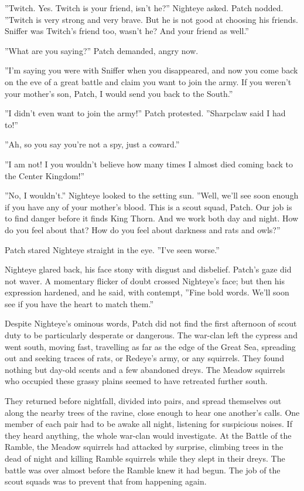 \documentclass[11pt]{article}
\begin{document}
 ''Twitch. Yes. Twitch is your friend, isn't he?'' Nighteye asked. Patch nodded. ''Twitch is very strong and very brave. But he is not good at choosing his friends. Sniffer was Twitch's friend too, wasn't he? And your friend as well.''\par
 ''What are you saying?'' Patch demanded, angry now.\par
 ''I'm saying you were with Sniffer when you disappeared, and now you come back on the eve of a great battle and claim you want to join the army. If you weren't your mother's son, Patch, I would send you back to the South.''\par
 ''I didn't even want to join the army!'' Patch protested. ''Sharpclaw said I had to!''\par
 ''Ah, so you say you're not a spy, just a coward.''\par
 ''I am not! I %
 you wouldn't believe how many times I almost died coming back to the Center Kingdom!''\par
 ''No, I wouldn't.'' Nighteye looked to the setting sun. ''Well, we'll see soon enough if you have any of your mother's blood. This is a scout squad, Patch. Our job is to find danger before it finds King Thorn. And we work both day and night. How do you feel about that? How do you feel about darkness and rats and owls?''\par
 Patch stared Nighteye straight in the eye. ''I've seen worse.''\par
 Nighteye glared back, his face stony with disgust and disbelief. Patch's gaze did not waver. A momentary flicker of doubt crossed Nighteye's face; but then his expression hardened, and he said, with contempt, ''Fine bold words. We'll soon see if you have the heart to match them.''\par
 Despite Nighteye's ominous words, Patch did not find the first afternoon of scout duty to be particularly desperate or dangerous. The war-clan left the cypress and went south, moving fast, travelling as far as the edge of the Great Sea, spreading out and seeking traces of rats, or Redeye's army, or any squirrels. They found nothing but day-old scents and a few abandoned dreys. The Meadow squirrels who occupied these grassy plains seemed to have retreated further south.\par
 They returned before nightfall, divided into pairs, and spread themselves out along the nearby trees of the ravine, close enough to hear one another's calls. One member of each pair had to be awake all night, listening for suspicious noises. If they heard anything, the whole war-clan would investigate. At the Battle of the Ramble, the Meadow squirrels had attacked by surprise, climbing trees in the dead of night and killing Ramble squirrels while they slept in their dreys. The battle was over almost before the Ramble knew it had begun. The job of the scout squads was to prevent that from happening again.\par
\end{document}
